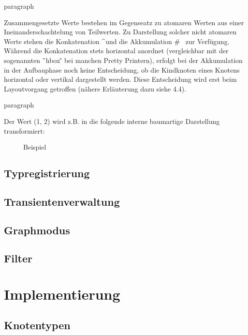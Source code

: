 \documentclass[12pt,a4paper]{article}
\begin{document}
paragraph{}

Zusammengesetzte Werte bestehen im Gegenseatz zu atomaren Werten aus einer
Ineinanderschachtelung von Teilwerten. Zu Darstellung solcher nicht atomaren
Werte stehen die Konkatenation \^\quad und die Akkumulation 
\# \lbrack \, \rbrack \quad zur Verf\"ugung.\\ \vspace*{5mm} 
W\"ahrend die Konkatenation stets horizontal anordnet (vergleichbar mit der 
sogenannten \"`hbox\"' bei manchen Pretty Printern), 
erfolgt bei der Akkumulation in der Aufbauphase 
noch keine Entscheidung, ob die Kindknoten eines Knotens horizontal oder 
vertikal dargestellt werden. Diese Entscheidung wird erst beim Layoutvorgang
getroffen (n\"ahere Erl\"auterung dazu siehe 4.4).

paragraph{}

Der Wert \large{(1, 2)} \normalsize wird z.B. in die folgende interne 
baumartige Darstellung transformiert: \\

\begin{figure}[h]
\center
{}
\caption{Beispiel}
\end{figure}

\subsection{Typregistrierung}

\subsection{Transientenverwaltung}

\subsection{Graphmodus}

\subsection{Filter} 



\section{Implementierung}

\subsection{Knotentypen}
\end{document}
